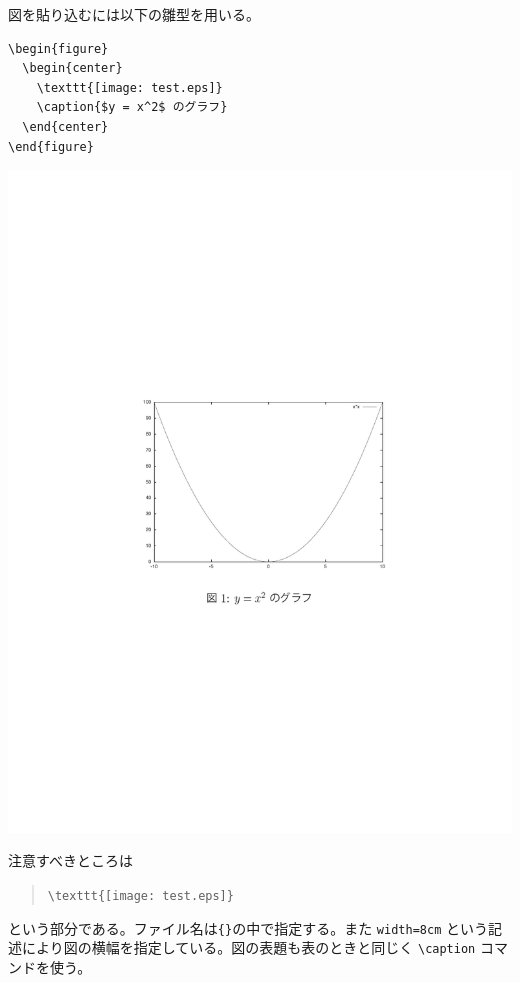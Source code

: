 図を貼り込むには以下の雛型を用いる。
\begin{reidai}
\begin{verbatim}
\begin{figure}
  \begin{center}
    \texttt{[image: test.eps]}
    \caption{$y = x^2$ のグラフ}
  \end{center}
\end{figure}
\end{verbatim}
\end{reidai}
\vspace*{-1.5em}
\begin{kekka}
  \begin{center}
    \includegraphics{figure.pdf}
  \end{center}
\end{kekka} \noindent
注意すべきところは
\begin{quotation}
  \verb|\texttt{[image: test.eps]}|
\end{quotation}
という部分である。ファイル名は{\tt \{\}}の中で指定する。また \texttt{width=8cm} という記述により図の横幅を指定している。図の表題も表のときと同じく \verb|\caption| コマンドを使う。

